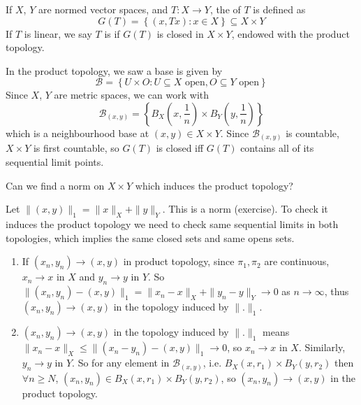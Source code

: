 \begin{defn}[T closed]
    If $X$, $Y$ are normed vector spaces, and $T : X \to Y$, the  of $T$ is defined as
    \[
        G(T) = \left\{ (x, Tx) : x \in X \right\} \subseteq X \times Y
    \]    
    If $T$ is linear, we say $T$ is  if $G(T)$ is closed in $X \times Y$, endowed
    with the product topology.   
\end{defn}
\begin{rem}
    In the product topology, we saw a base is given by 
    \[
        \mathcal{B} = \left\{ U \times O : U \subseteq X \text{ open}, O \subseteq Y \text{ open} \right\} 
    \] 
    Since $X$, $Y$ are metric spaces, we can work with
    \[
        \mathcal{B}_{(x, y)} = \left\{ B_X(x, \frac{1}{n}) \times B_Y(y, \frac{1}{n}) \right\} 
    \]   
    which is a neighbourhood base at $(x, y) \in X \times Y$.
    Since $\mathcal{B}_{(x, y)}$ is countable, $X \times Y$ is first countable, 
    so $G(T)$ is closed iff $G(T)$ contains all of its sequential limit points.  
\end{rem}

\begin{goal}[question]
    Can we find a norm on $X \times Y$ which induces the product topology? 
\end{goal}

Let $\| (x, y) \|_1 = \| x \|_X + \| y \|_Y   $. This is a norm (exercise).
To check it induces the product topology we need to check same sequential limits in both topologies,
which implies the same closed sets and same opens sets. 

\begin{enumerate}
    \item If $(x_n, y_n) \to (x, y)$ in product topology, since $\pi_1, \pi_2$ are continuous,
    $x_n \to x$ in $X$ and $y_n \to y$ in $Y$. So 
    $\| (x_n, y_n) - (x, y) \|_1 = \| x_n - x \|_X + \| y_n - y \|_Y \to 0$ as $n \to \infty$,
    thus $(x_n, y_n) \to (x, y)$ in the topology induced by $\| . \|_1$.
    \item $(x_n, y_n) \to (x, y)$ in the topology induced by $\| . \|_1$ means 
    $\| x_n - x \|_X \leq \| (x_n - y_n) - (x, y) \|_1 \to 0  $, so $x_n \to x$ in $X$.
     Similarly, $y_n \to y$ in $Y$. So for any element in $\mathcal{B}_{(x, y)}$, 
     i.e. $B_X(x, r_1) \times B_Y(y, r_2)$ then $\forall n \geq N$, 
     $(x_n, y_n) \in B_X(x, r_1) \times B_Y(y, r_2)$, so $(x_n, y_n) \to (x, y)$ in the product topology.  
\end{enumerate}

